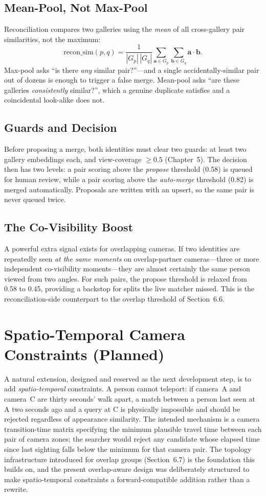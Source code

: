 \documentclass[12pt]{report}
\begin{document}
\subsection{Mean-Pool, Not Max-Pool}
Reconciliation compares two galleries using the \emph{mean} of all cross-gallery pair similarities, not the maximum:
\[
\text{recon\_sim}(p, q) = \frac{1}{|G_p|\,|G_q|} \sum_{\mathbf{a} \in G_p} \sum_{\mathbf{b} \in G_q} \mathbf{a} \cdot \mathbf{b} .
\]
Max-pool asks ``is there \emph{any} similar pair?''---and a single accidentally-similar pair out of dozens is enough to trigger a false merge. Mean-pool asks ``are these galleries \emph{consistently} similar?'', which a genuine duplicate satisfies and a coincidental look-alike does not.

\subsection{Guards and Decision}
Before proposing a merge, both identities must clear two guards: at least two gallery embeddings each, and view-coverage $\geq 0.5$ (Chapter~5). The decision then has two levels: a pair scoring above the \emph{propose} threshold (0.58) is queued for human review, while a pair scoring above the \emph{auto-merge} threshold (0.82) is merged automatically. Proposals are written with an upsert, so the same pair is never queued twice.

\subsection{The Co-Visibility Boost}
A powerful extra signal exists for overlapping cameras. If two identities are repeatedly seen \emph{at the same moments} on overlap-partner cameras---three or more independent co-visibility moments---they are almost certainly the same person viewed from two angles. For such pairs, the propose threshold is relaxed from 0.58 to 0.45, providing a backstop for splits the live matcher missed. This is the reconciliation-side counterpart to the overlap threshold of Section~6.6.

\section{Spatio-Temporal Camera Constraints (Planned)}
A natural extension, designed and reserved as the next development step, is to add \emph{spatio-temporal} constraints. A person cannot teleport: if camera~A and camera~C are thirty seconds' walk apart, a match between a person last seen at A two seconds ago and a query at C is physically impossible and should be rejected regardless of appearance similarity. The intended mechanism is a camera transition-time matrix specifying the minimum plausible travel time between each pair of camera zones; the searcher would reject any candidate whose elapsed time since last sighting falls below the minimum for that camera pair. The topology infrastructure introduced for overlap groups (Section~6.7) is the foundation this builds on, and the present overlap-aware design was deliberately structured to make spatio-temporal constraints a forward-compatible addition rather than a rewrite.
\end{document}
